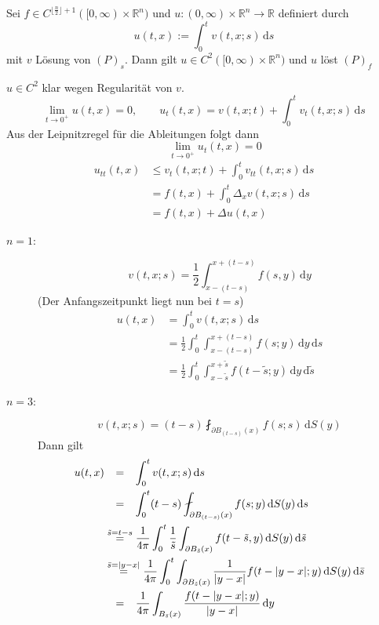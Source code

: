 \begin{satz}
	Sei $f \in C^{\lfloor \frac{n}{2} \rfloor +1}([0,\infty) \times \mathbb{R}^n)$ und $u: (0, \infty) \times \mathbb{R}^n \to \mathbb{R}$ definiert durch
	\[
		u(t,x):= \int_{0}^{t} v(t,x;s) \,\mathrm{d}s 
	\]
	mit $v$ Lösung von $(P)_s$. Dann gilt $u \in C^2([0,\infty) \times \mathbb{R}^n)$ und $u$ löst $(P)_f$
\end{satz}
\begin{beweis}
	$u \in C^2$ klar wegen Regularität von $v$. \\
	\[
		\lim_{t \to 0^+} u(t,x) = 0, \qquad u_t(t,x) = v(t,x;t) + \int_{0}^{t} v_t(t,x;s) \,\mathrm{d}s
	\]
	Aus der Leipnitzregel für die Ableitungen folgt dann
	\[
		 \qquad \lim_{t \to 0^+} u_t(t,x) = 0
	\]
	\begin{align*}
		u_{tt}(t,x) &\leq v_t(t,x;t) + \int_{0}^{t} v_{tt}(t,x;s) \,\mathrm{d}s  \\
		&= f(t,x) + \int_{0}^{t} \Delta_x v(t,x;s) \,\mathrm{d}s \\
		&= f(t,x) + \Delta u(t,x)
	\end{align*}
\end{beweis}
\begin{description}
	\item[$n=1$:]
	\[
		v(t,x;s) = \frac{1}{2} \int_{x-(t-s)}^{x+(t-s)} f(s,y) \,\mathrm{d}y
	\]
	(Der Anfangszeitpunkt liegt nun bei $t=s$)
	\begin{align*}
		u(t,x)&= \int_{0}^{t}v(t,x;s) \,\mathrm{d}s \\ &= \frac{1}{2} \int_{0}^{t} \int_{x-(t-s)}^{x+(t-s)} f(s;y) \,\mathrm{d}y \,\mathrm{d}s \\
		&= \frac{1}{2} \int_{0}^{t} \int_{x- \tilde s}^{x + \tilde s} f(t- \tilde s;y) \,\mathrm{d}y \,\mathrm{d} \tilde s
	\end{align*}
	\item[$n=3$:] 
	\[
		v(t,x;s) = (t-s) \fint_{\partial B_{(t-s)}(x)}^{} f(s;s) \,\mathrm{d}S(y)
	\]
	Dann gilt
	\begin{align*}
		u(t,x) & \stackrel{\hphantom{\tilde s = t-s}}{=} \int_{0}^{t} v(t,x;s) \,\mathrm{d}s \\
		& \stackrel{\hphantom{\tilde s = t-s}}{=} \int_{0}^{t}(t-s) \fint_{\partial B_{(t-s)}(x)}^{} f(s;y) \,\mathrm{d}S(y) \,\mathrm{d}s \\
		& \stackrel{\tilde s = t-s}{=} \frac{1}{4 \pi} \int_{0}^{t} \frac{1}{\tilde s} \int_{\partial B_{\tilde s}(x)}^{} f(t- \tilde s,y)
		 \,\mathrm{d}S(y) \,\mathrm{d} \tilde s \\
		& \stackrel{ \bar{s} = \abs{y-x}}{=} \frac{1}{4 \pi} \int_{0}^{t} \int_{\partial B_{\tilde s}(x)}^{} \frac{1}{\abs{y-x}} f(t-\abs{y-x};y) \,\mathrm{d}S(y) \,\mathrm{d} \bar{s} \\
	&\stackrel{\hphantom{\tilde s = t-s}}{=}	\frac{1}{4 \pi} \int_{B_{\bar{s}}(x)}^{} \frac{f(t- \abs{y-x};y)}{\abs{y-x}} \,\mathrm{d}y
	\end{align*}
\end{description}


